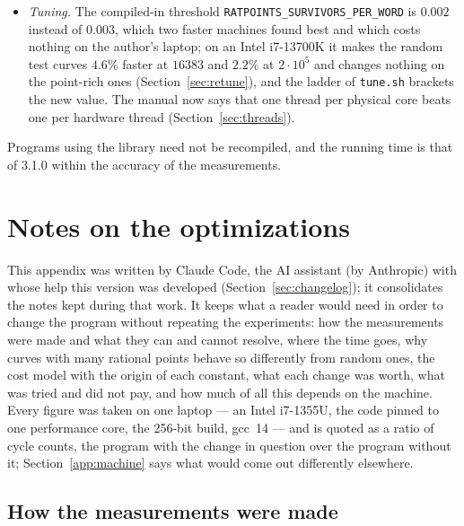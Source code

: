 \documentclass[12pt,a4paper,oneside]{amsart}
\begin{document}
\begin{itemize}
        them by brute force (Section~\ref{sec:tests}). \texttt{bench\_init}
        builds again, and \texttt{make test} runs its check of the sieve
        tables (\texttt{testinit}).
  \item \emph{Tuning.} The compiled-in threshold
        \texttt{RATPOINTS\_SURVIVORS\_PER\_WORD} is $0.002$ instead of
        $0.003$, which two faster machines found best and which costs nothing
        on the author's laptop; on an Intel i7-13700K it makes the random test
        curves $4.6\%$ faster at $16383$ and $2.2\%$ at $2\cdot10^5$ and
        changes nothing on the point-rich ones (Section~\ref{sec:retune}), and
        the ladder of \texttt{tune.sh} brackets the new value. The manual now
        says that one thread per physical core beats one per hardware thread
        (Section~\ref{sec:threads}).
\end{itemize}
Programs using the library need not be recompiled, and the running time is
that of 3.1.0 within the accuracy of the measurements.


\appendix

\section{Notes on the optimizations}\label{app:notes}

This appendix was written by Claude Code, the AI assistant (by Anthropic)
with whose help this version was developed (Section~\ref{sec:changelog}); it
consolidates the notes kept during that work. It keeps what a reader would
need in order to change the program without repeating the experiments: how
the measurements were made and what they can and cannot resolve, where the
time goes, why curves with many rational points behave so differently from
random ones, the cost model with the origin of each constant, what each
change was worth, what was tried and did not pay, and how much of all this
depends on the machine. Every figure was taken on one laptop --- an Intel
i7-1355U, the code pinned to one performance core, the 256-bit build,
gcc~14 --- and is quoted as a ratio of cycle counts, the program with the
change in question over the program without it;
Section~\ref{app:machine} says what would come out differently elsewhere.

\subsection{How the measurements were made}\label{app:measure}
\end{document}
